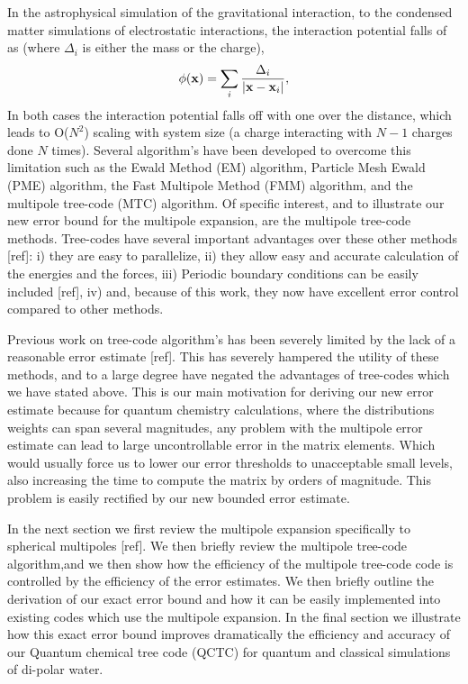\documentclass[prb,aps,nobibnotes,twocolumn,doublespace,twocolumngrid,superbib]{revtex4}
\begin{document}
%
In the astrophysical simulation of the gravitational interaction, to the condensed matter simulations of 
electrostatic interactions, the interaction potential falls of as (where $\Delta_i$ is either the mass 
or the charge), 
\begin{equation}
\phi({\bf x})= \sum_i {\Delta_i \over |{\bf x} - {\bf x}_i|},
\end{equation}
% 
In both cases the interaction potential falls off with one over the distance, 
which leads to {\cal O}($N^2$) scaling with system size (a charge interacting with $N-1$ 
charges done $N$ times). 
%
Several algorithm's have been developed to overcome this limitation such as the 
Ewald Method (EM)  \cite{DFincham94} algorithm, 
Particle Mesh Ewald (PME) \cite{luty:94}  algorithm, 
the Fast Multipole Method (FMM) \cite{Singh93,shimada:94,singer:95a}  algorithm,
and the multipole tree-code (MTC) \cite{JSalmon94} algorithm. 
%
Of specific interest, and to illustrate our new error bound for the multipole expansion, 
are the multipole tree-code methods. 
%
Tree-codes have several important advantages over these other methods [ref]: i) 
they are easy to parallelize, ii) they allow easy and accurate calculation of the 
energies and the forces, iii) Periodic boundary conditions can be easily included [ref], iv) 
and, because of this work, they now have excellent error control compared to other methods.
%

Previous work on tree-code algorithm's has been severely limited by the lack of
a reasonable error estimate [ref]. 
%
This has severely hampered the utility of these methods, and to a large degree have negated the advantages
of tree-codes which we have stated above.
%
This is our main motivation for deriving our new error estimate because for quantum chemistry calculations, 
where the distributions weights can span several magnitudes, any problem with the multipole error 
estimate can lead to large uncontrollable error in the matrix elements. 
%
Which would usually force us to lower our error 
thresholds to unacceptable small levels, also increasing the time to compute the matrix by orders of
magnitude. 
%
This problem is easily rectified by our new bounded error estimate.
%
%
%

In the next section we first review the multipole expansion specifically to spherical multipoles [ref]. 
%
We then briefly review the multipole tree-code algorithm,and we then show how the efficiency of 
the multipole tree-code code is controlled by the efficiency of the error estimates. 
%
We then briefly outline the derivation of our exact error bound and how it can be easily implemented 
into existing codes which use the multipole expansion.
%
In the final section we illustrate how this exact error bound improves dramatically the efficiency 
and accuracy of our Quantum chemical tree code (QCTC) for quantum and classical simulations 
of di-polar water.
\end{document}
